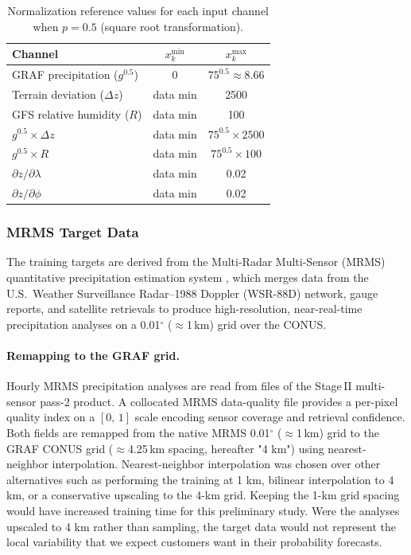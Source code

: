 \documentclass[11pt]{article}
\begin{document}
\begin{table}[ht]
\centering
\caption{Normalization reference values for each input channel
  when $p = 0.5$ (square root transformation).}
\label{tab:normalization}
\begin{tabular}{lcc}
\toprule
Channel & $x_k^{\min}$ & $x_k^{\max}$ \\
\midrule
GRAF precipitation ($g^{0.5}$) & 0 & $75^{0.5} \approx 8.66$ \\
Terrain deviation ($\Delta z$) & data min & 2500 \\
GFS relative humidity ($R$) & data min & 100 \\
$g^{0.5} \times \Delta z$ & data min & $75^{0.5} \times 2500$ \\
$g^{0.5} \times R$ & data min & $75^{0.5} \times 100$ \\
$\partial z / \partial \lambda$ & data min & 0.02 \\
$\partial z / \partial \phi$ & data min & 0.02 \\
\bottomrule
\end{tabular}
\end{table}

\subsubsection{MRMS Target Data}
\label{sec:mrms}

The training targets are derived from the Multi-Radar Multi-Sensor
(MRMS) quantitative precipitation estimation system \citep{zhang2016},
which merges data from the U.S.\ Weather Surveillance Radar--1988 Doppler (WSR-88D) network, gauge
reports, and satellite retrievals to produce high-resolution,
near-real-time precipitation analyses on a 0.01$^{\circ}$
($\approx$1\,km) grid over the CONUS.

\paragraph{Remapping to the GRAF grid.}
Hourly MRMS precipitation analyses are read from files of the Stage\,II
multi-sensor pass-2 product.  A collocated MRMS
data-quality file provides a per-pixel quality index on a
$[0,\,1]$ scale encoding sensor coverage and retrieval confidence.
Both fields are remapped from the native MRMS 0.01$^{\circ}$
($\approx$1\,km) grid to the GRAF CONUS grid ($\approx$4.25\,km
spacing, hereafter "4 km") using nearest-neighbor interpolation.
Nearest-neighbor interpolation was chosen over other alternatives
such as performing the training at 1 km, bilinear interpolation to 4 km,
or a conservative upscaling to the 4-km grid.
Keeping the 1-km grid spacing would have
increased training time for this preliminary study.
Were the analyses upscaled to 4 km rather than
sampling, the target data would not represent the local variability that we expect
customers want in their probability forecasts.
\end{document}

